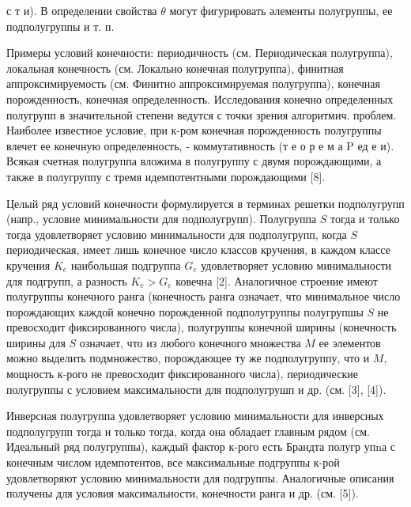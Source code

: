 \documentclass[10pt]{article}
\begin{document}
с т и). В определении свойства $\theta$ могут фигурировать әлементы полугруппы, ее подполугруппы и т. п.



Примеры условий конечности: периодичность (см. Периодическая полугруппа), локальная конечность (см. Локально конечная полугруппа), финитная аппроксимируемость (см. Финитно аппроксимируемая полугруппа), конечная порожденность, конечная определенность. Исследования конечно определенных полугрупп в значительной степени ведутся с точки зрения алгоритмич. проблем. Наиболее известное условие, при к-ром конечная порожденность полугруппы влечет ее конечную определенность, - коммутативность (т е о р е м а $\mathrm{P}$ ед е и). Всякая счетная полугруппа вложима в полугруппу с двумя порождающими, а также в полугруппу с тремя идемпотентными порождающими [8].



Целый ряд условий конечности формулируется в терминах решетки подполугрупп (напр., условие минимальности для подполугрупп). Полугруппа $S$ тогда и только тогда удовлетворяет условию минимальности для подполугрупп, когда $S$ периодическая, имеет лишь конечное число классов кручения, в каждом классе кручения $K_{e}$ наибольшая подгруппа $G_{e}$ удовлетворяет условию минимальности для подгрупп, а разность $K_{e}>G_{e}$ ковечна [2]. Аналогичное строение имеют полугруппы конечного ранга (конечность ранга означает, что минимальное число порождающих каждой конечно порожденной подполугруппы полугрупшы $S$ не превосходит фиксированного числа), полугруппы конечной ширины (конечность ширины для $S$ означает, что из любого конечного множества $M$ ее элементов можно выделить подмножество, порождающее ту же подполугруппу, что и $M$, мощность к-рого не превосходит фиксированного числа), периодические полугруппы с условием максимальности для подполугрушп и др. (см. [3], [4]).



Инверсная полугруппа удовлетворяет условию минимальности для инверсных подполугрупп тогда и только тогда, когда она обладает главным рядом (см. Идеальный ряд полугруппы), каждый фактор к-рого есть Брандта полугр упnа с конечным числом идемпотентов, все максимальные подгруппы к-рой удовлетворяют условию минимальности для подгруппы. Аналогичные описания получены для условия максимальности, конечности ранга и др. (см. [5]).
\end{document}
